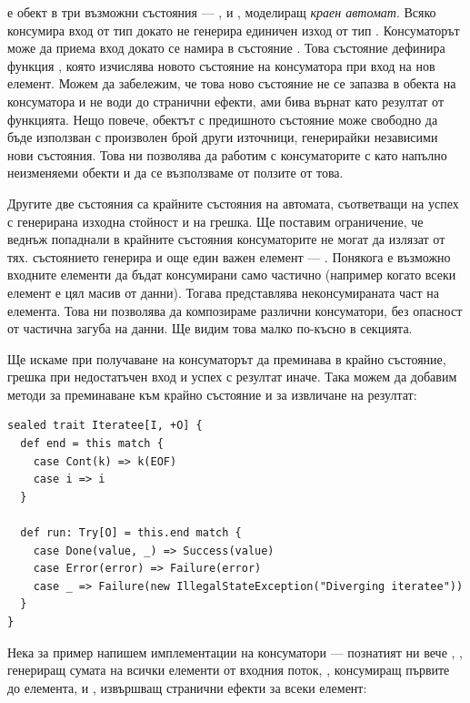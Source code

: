  е обект в три възможни състояния — ,  и , моделиращ \emph{краен автомат}. Всяко  консумира вход от тип  докато не генерира единичен изход от тип . Консуматорът може да приема вход докато се намира в състояние . Това състояние дефинира функция , която изчислява новото състояние на консуматора при вход на нов елемент. Можем да забележим, че това ново състояние не се запазва в обекта на консуматора и не води до странични ефекти, ами бива върнат като резултат от функцията. Нещо повече, обектът с предишното състояние може свободно да бъде използван с произволен брой други източници, генерирайки независими нови състояния. Това ни позволява да работим с консуматорите с като напълно неизменяеми обекти и да се възползваме от ползите от това.

Другите две състояния са крайните състояния на автомата, съответващи на успех с генерирана изходна стойност и на грешка. Ще поставим ограничение, че веднъж попаднали в крайните състояния  консуматорите не могат да излязат от тях.  състоянието генерира и още един важен елемент — . Понякога е възможно входните елементи да бъдат консумирани само частично (например когато всеки елемент е цял масив от данни). Тогава  представлява неконсумираната част на елемента. Това ни позволява да композираме различни  консуматори, без опасност от частична загуба на данни. Ще видим това малко по-късно в секцията.

Ще искаме при получаване на  консуматорът да преминава в крайно състояние, грешка при недостатъчен вход и успех с резултат иначе. Така можем да добавим методи за преминаване към крайно състояние  и за извличане на резултат:

\begin{lstlisting}
sealed trait Iteratee[I, +O] {
  def end = this match {
    case Cont(k) => k(EOF)
    case i => i
  }
  
  def run: Try[O] = this.end match {
    case Done(value, _) => Success(value)
    case Error(error) => Failure(error)
    case _ => Failure(new IllegalStateException("Diverging iteratee"))
  }
}
\end{lstlisting}

Нека за пример напишем имплементации на  консуматори — познатият ни вече , , генериращ сумата на всички елементи от входния поток, , консумиращ първите до  елемента, и , извършващ странични ефекти за всеки елемент:

